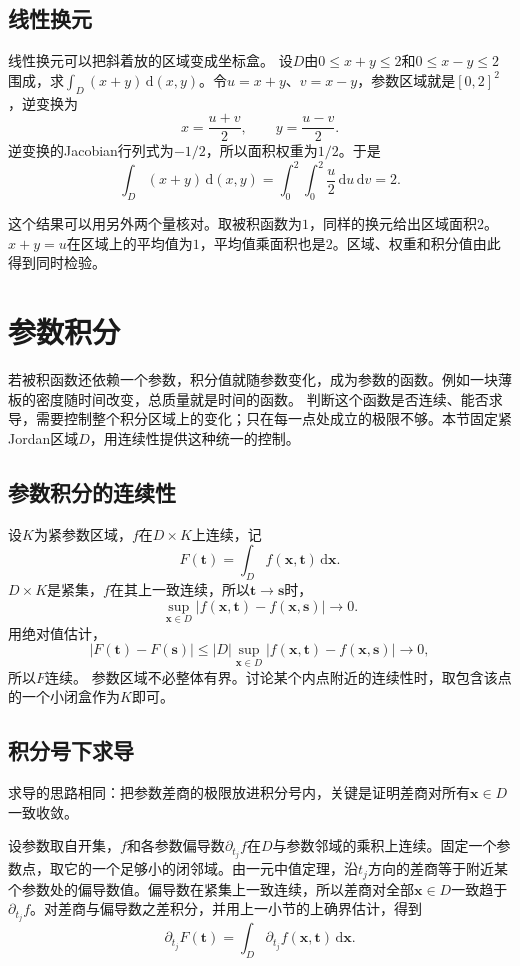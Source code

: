 \subsection{线性换元}

线性换元可以把斜着放的区域变成坐标盒。
设$D$由$0\leq x+y\leq2$和$0\leq x-y\leq2$围成，求$\int_D(x+y)\,\mathrm d(x,y)$。令$u=x+y$、$v=x-y$，参数区域就是$[0,2]^2$，逆变换为
\[
 x=\frac{u+v}2,\qquad y=\frac{u-v}2.
\]
逆变换的Jacobian行列式为$-1/2$，所以面积权重为$1/2$。于是
\[
 \int_D(x+y)\,\mathrm d(x,y)
 =\int_0^2\int_0^2\frac u2\,\mathrm du\,\mathrm dv=2.
\]

这个结果可以用另外两个量核对。取被积函数为$1$，同样的换元给出区域面积$2$。$x+y=u$在区域上的平均值为$1$，平均值乘面积也是$2$。区域、权重和积分值由此得到同时检验。

\section{参数积分}

若被积函数还依赖一个参数，积分值就随参数变化，成为参数的函数。例如一块薄板的密度随时间改变，总质量就是时间的函数。
判断这个函数是否连续、能否求导，需要控制整个积分区域上的变化；只在每一点处成立的极限不够。本节固定紧Jordan区域$D$，用连续性提供这种统一的控制。

\subsection{参数积分的连续性}

设$K$为紧参数区域，$f$在$D\times K$上连续，记
\[
 F(\bm t)=\int_D f(\bm x,\bm t)\,\mathrm d\bm x.
\]
$D\times K$是紧集，$f$在其上一致连续，所以$\bm t\to\bm s$时，
\[
 \sup_{\bm x\in D}|f(\bm x,\bm t)-f(\bm x,\bm s)|\longrightarrow0.
\]
用绝对值估计，
\[
 |F(\bm t)-F(\bm s)|
 \leq |D|\sup_{\bm x\in D}|f(\bm x,\bm t)-f(\bm x,\bm s)|\longrightarrow0,
\]
所以$F$连续。
参数区域不必整体有界。讨论某个内点附近的连续性时，取包含该点的一个小闭盒作为$K$即可。

\subsection{积分号下求导}

求导的思路相同：把参数差商的极限放进积分号内，关键是证明差商对所有$\bm x\in D$一致收敛。

设参数取自开集，$f$和各参数偏导数$\partial_{t_j}f$在$D$与参数邻域的乘积上连续。固定一个参数点，取它的一个足够小的闭邻域。由一元中值定理，沿$t_j$方向的差商等于附近某个参数处的偏导数值。偏导数在紧集上一致连续，所以差商对全部$\bm x\in D$一致趋于$\partial_{t_j}f$。对差商与偏导数之差积分，并用上一小节的上确界估计，得到
\begin{equation}
 \partial_{t_j}F(\bm t)=\int_D\partial_{t_j}f(\bm x,\bm t)\,\mathrm d\bm x.
\label{eq:classical-differentiate-under-integral}
\end{equation}

